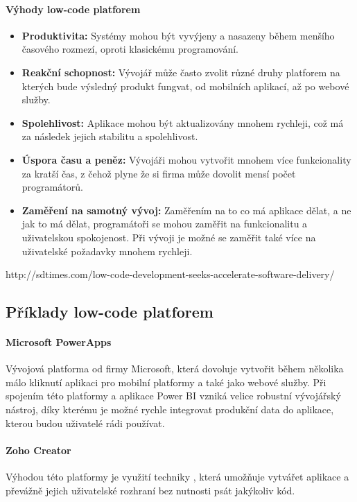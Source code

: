 \paragraph{Výhody low-code platforem}
\begin{itemize}
  \item \textbf{Produktivita:} Systémy mohou být vyvýjeny a nasazeny během menšího časového rozmezí, oproti klasickému programování.
  \item \textbf{Reakční schopnost:} Vývojář může často zvolit různé druhy platforem na kterých bude výsledný produkt fungvat, od mobilních aplikací, až po webové služby.
  \item \textbf{Spolehlivost:} Aplikace mohou být aktualizovány mnohem rychleji, což má za následek jejich stabilitu a spolehlivost.
  \item \textbf{Úspora času a peněz:} Vývojáři mohou vytvořit mnohem více funkcionality za kratší čas, z čehož plyne že si firma může dovolit mensí počet programátorů.
  \item \textbf{Zaměření na samotný vývoj:} Zaměřením na to co má aplikace dělat, a ne jak to má dělat, programátoři se mohou zaměřit na funkcionalitu a uživatelskou spokojenost. Při vývoji je možné se zaměřit také více na uživatelské požadavky mnohem rychleji.
\end{itemize}
http://sdtimes.com/low-code-development-seeks-accelerate-software-delivery/

\subsection{Příklady low-code platforem}
\paragraph{Microsoft PowerApps} Vývojová platforma od firmy Microsoft, která dovoluje vytvořit během několika málo kliknutí aplikaci pro mobilní platformy a také jako webové služby. Při spojením této platformy a aplikace Power BI vzniká velice robustní vývojářský nástroj, díky kterému je možné rychle integrovat produkční data do aplikace, kterou budou uživatelé rádi používat. \cite{pcmag-no-coding}
\paragraph{Zoho Creator} Výhodou této platformy je využití techniky , která umožňuje vytvářet aplikace a převážně jejich uživatelské rozhraní bez nutnosti psát jakýkoliv kód. \cite{zoho-review}
